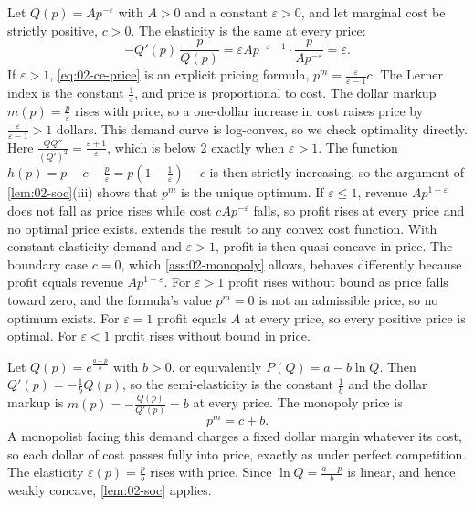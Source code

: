 \begin{example}\label{ex:02-ce}
Let $Q(p) = Ap^{-\varepsilon}$ with $A > 0$ and a constant $\varepsilon > 0$, and let marginal cost be strictly
positive, $c > 0$. The elasticity is the same at every price:
\[
  -Q'(p)\,\frac{p}{Q(p)} = \varepsilon A p^{-\varepsilon - 1}\cdot\frac{p}{Ap^{-\varepsilon}} = \varepsilon .
\]
If $\varepsilon > 1$, \eqref{eq:02-ce-price} is an explicit pricing formula, $p^m = \frac{\varepsilon}{\varepsilon -
1}c$. The Lerner index is the constant $\frac{1}{\varepsilon}$, and price is proportional to cost. The dollar markup
$m(p) = \frac{p}{\varepsilon}$ rises with price, so a one-dollar increase in cost raises price by
$\frac{\varepsilon}{\varepsilon - 1} > 1$ dollars. This demand curve is log-convex, so we check optimality
directly. Here $\frac{QQ''}{(Q')^2} = \frac{\varepsilon + 1}{\varepsilon}$, which is below 2 exactly when
$\varepsilon > 1$. The function $h(p) = p - c - \frac{p}{\varepsilon} = p\left(1 - \frac{1}{\varepsilon}\right) -
c$ is then strictly increasing, so the argument of \cref{lem:02-soc}(iii) shows that $p^m$ is the unique optimum. If
$\varepsilon \le 1$, revenue $Ap^{1 - \varepsilon}$ does not fall as price rises while cost $cAp^{-\varepsilon}$
falls, so profit rises at every price and no optimal price exists. \citet[Exercise~1.4]{Tirole1988} extends the
result to any convex cost function. With constant-elasticity demand and $\varepsilon > 1$, profit is then
quasi-concave in price. The boundary case $c = 0$, which \cref{ass:02-monopoly} allows, behaves differently
because profit equals revenue $Ap^{1 - \varepsilon}$. For $\varepsilon > 1$ profit rises without bound as price
falls toward zero, and the formula's value $p^m = 0$ is not an admissible price, so no optimum exists. For
$\varepsilon = 1$ profit equals $A$ at every price, so every positive price is optimal. For $\varepsilon < 1$
profit rises without bound in price.
\end{example}

\begin{example}\label{ex:02-exponential}
Let $Q(p) = e^{\frac{a - p}{b}}$ with $b > 0$, or equivalently $P(Q) = a - b\ln Q$. Then $Q'(p) = -\frac{1}{b}Q(p)$,
so the semi-elasticity is the constant $\frac{1}{b}$ and the dollar markup is $m(p) = -\frac{Q(p)}{Q'(p)} = b$ at
every price. The monopoly price is
\[
  p^m = c + b .
\]
A monopolist facing this demand charges a fixed dollar margin whatever its cost, so each dollar of cost passes
fully into price, exactly as under perfect competition. The elasticity $\varepsilon(p) = \frac{p}{b}$ rises with
price. Since $\ln Q = \frac{a - p}{b}$ is linear, and hence weakly concave, \cref{lem:02-soc} applies.
\end{example}

